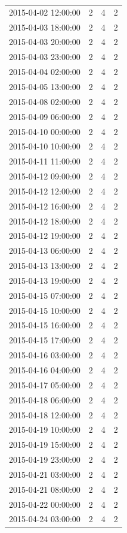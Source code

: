 \begin{tabular}{lrrr}
2015-04-02 12:00:00 & 2 & 4 & 2 \\
2015-04-03 18:00:00 & 2 & 4 & 2 \\
2015-04-03 20:00:00 & 2 & 4 & 2 \\
2015-04-03 23:00:00 & 2 & 4 & 2 \\
2015-04-04 02:00:00 & 2 & 4 & 2 \\
2015-04-05 13:00:00 & 2 & 4 & 2 \\
2015-04-08 02:00:00 & 2 & 4 & 2 \\
2015-04-09 06:00:00 & 2 & 4 & 2 \\
2015-04-10 00:00:00 & 2 & 4 & 2 \\
2015-04-10 10:00:00 & 2 & 4 & 2 \\
2015-04-11 11:00:00 & 2 & 4 & 2 \\
2015-04-12 09:00:00 & 2 & 4 & 2 \\
2015-04-12 12:00:00 & 2 & 4 & 2 \\
2015-04-12 16:00:00 & 2 & 4 & 2 \\
2015-04-12 18:00:00 & 2 & 4 & 2 \\
2015-04-12 19:00:00 & 2 & 4 & 2 \\
2015-04-13 06:00:00 & 2 & 4 & 2 \\
2015-04-13 13:00:00 & 2 & 4 & 2 \\
2015-04-13 19:00:00 & 2 & 4 & 2 \\
2015-04-15 07:00:00 & 2 & 4 & 2 \\
2015-04-15 10:00:00 & 2 & 4 & 2 \\
2015-04-15 16:00:00 & 2 & 4 & 2 \\
2015-04-15 17:00:00 & 2 & 4 & 2 \\
2015-04-16 03:00:00 & 2 & 4 & 2 \\
2015-04-16 04:00:00 & 2 & 4 & 2 \\
2015-04-17 05:00:00 & 2 & 4 & 2 \\
2015-04-18 06:00:00 & 2 & 4 & 2 \\
2015-04-18 12:00:00 & 2 & 4 & 2 \\
2015-04-19 10:00:00 & 2 & 4 & 2 \\
2015-04-19 15:00:00 & 2 & 4 & 2 \\
2015-04-19 23:00:00 & 2 & 4 & 2 \\
2015-04-21 03:00:00 & 2 & 4 & 2 \\
2015-04-21 08:00:00 & 2 & 4 & 2 \\
2015-04-22 00:00:00 & 2 & 4 & 2 \\
2015-04-24 03:00:00 & 2 & 4 & 2 \\

\end{tabular}
